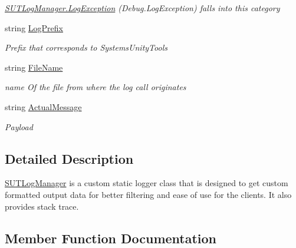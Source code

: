 \begin{DoxyCompactItemize}
\begin{DoxyCompactList}\small\item\em \mbox{\hyperlink{class_s_u_t_log_manager_a63a6a0200263f36810d6ede9ca578942}{S\+U\+T\+Log\+Manager.\+Log\+Exception}} (Debug.\+Log\+Exception) falls into this category \end{DoxyCompactList}\item 
string \mbox{\hyperlink{class_s_u_t_log_manager_a2e22a0dcde8c520e2b74ac0c42760941}{Log\+Prefix}}
\begin{DoxyCompactList}\small\item\em Prefix that corresponds to Systems\+Unity\+Tools \end{DoxyCompactList}\item 
string \mbox{\hyperlink{class_s_u_t_log_manager_a420cdff170ede050d07fe0ef2d22866e}{File\+Name}}
\begin{DoxyCompactList}\small\item\em name Of the file from where the log call originates \end{DoxyCompactList}\item 
string \mbox{\hyperlink{class_s_u_t_log_manager_a27407636aee838aa342bc54b250116b3}{Actual\+Message}}
\begin{DoxyCompactList}\small\item\em Payload \end{DoxyCompactList}\end{DoxyCompactItemize}


\subsection{Detailed Description}
\mbox{\hyperlink{class_s_u_t_log_manager}{S\+U\+T\+Log\+Manager}} is a custom static logger class that is designed to get custom formatted output data for better filtering and ease of use for the clients. It also provides stack trace. 



\subsection{Member Function Documentation}
\mbox{\label{class_s_u_t_log_manager_aefe5c2647d1f89847c677317b0106fb4}} 
